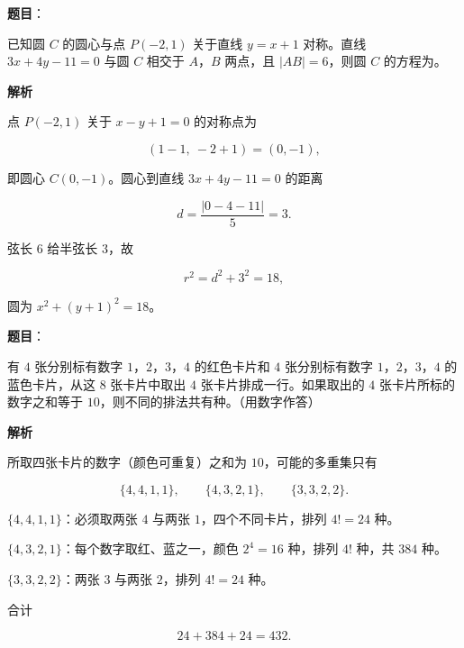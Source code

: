 \begin{answer}

\textbf{题目}：

已知圆 $C$ 的圆心与点 $P(-2,1)$ 关于直线 $y=x+1$ 对称。直线 $3x+4y-11=0$ 与圆 $C$ 相交于 $A$，$B$ 两点，且 $|AB|=6$，则圆 $C$ 的方程为\gkblank{}。

\textbf{解析}

点 $P(-2,1)$ 关于 $x-y+1=0$ 的对称点为

\nopagebreak[4]
\[\left(1-1,\ -2+1\right)=(0,-1),\]

即圆心 $C(0,-1)$。圆心到直线 $3x+4y-11=0$ 的距离

\nopagebreak[4]
\[d=\frac{|0-4-11|}5=3.\]

弦长 $6$ 给半弦长 $3$，故

\nopagebreak[4]
\[r^2=d^2+3^2=18,\]

圆为 $x^2+(y+1)^2=18$。


\end{answer}
\begin{answer}

\textbf{题目}：

有 $4$ 张分别标有数字 $1$，$2$，$3$，$4$ 的红色卡片和 $4$ 张分别标有数字 $1$，$2$，$3$，$4$ 的蓝色卡片，从这 $8$ 张卡片中取出 $4$ 张卡片排成一行。如果取出的 $4$ 张卡片所标的数字之和等于 $10$，则不同的排法共有\gkblank{}种。（用数字作答）

\textbf{解析}

所取四张卡片的数字（颜色可重复）之和为 $10$，可能的多重集只有

\nopagebreak[4]
\[\{4,4,1,1\},\qquad\{4,3,2,1\},\qquad\{3,3,2,2\}.\]

$\{4,4,1,1\}$：必须取两张 $4$ 与两张 $1$，四个不同卡片，排列 $4!=24$ 种。

$\{4,3,2,1\}$：每个数字取红、蓝之一，颜色 $2^4=16$ 种，排列 $4!$ 种，共 $384$ 种。

$\{3,3,2,2\}$：两张 $3$ 与两张 $2$，排列 $4!=24$ 种。

合计

\nopagebreak[4]
\[24+384+24=432.\]


\end{answer}
